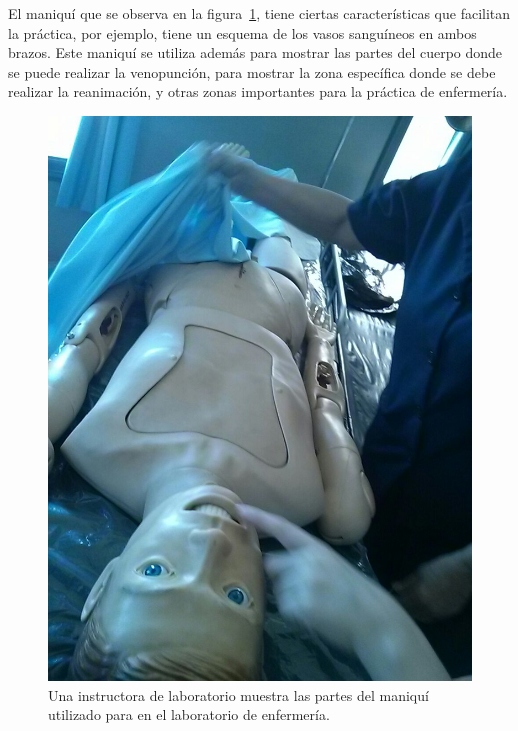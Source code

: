 

El maniquí que se observa en la figura~\ref{fig:iab_mani}, tiene ciertas
características que facilitan la práctica, por ejemplo, tiene un esquema de los
vasos sanguíneos en ambos brazos. Este maniquí se utiliza además para mostrar
las partes del cuerpo donde se puede realizar la venopunción, para mostrar la
zona específica donde se debe realizar la reanimación, y otras zonas importantes
para la práctica de enfermería.


\begin{figure}[h!t] 
\centering 
\includegraphics[scale=0.2,natwidth=400,natheight=200]{problema/iab_sala_3.jpg}
\caption{Una instructora de laboratorio muestra las partes del maniquí utilizado
    para en el laboratorio de enfermería.}
\label{fig:iab_mani}
\end{figure}

